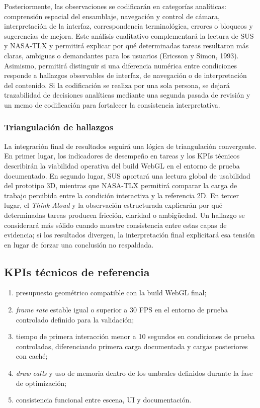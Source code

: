 Posteriormente, las observaciones se codificar\'an en categor\'ias anal\'iticas: comprensi\'on espacial del ensamblaje, navegaci\'on y control de c\'amara, interpretaci\'on de la interfaz, correspondencia terminol\'ogica, errores o bloqueos y sugerencias de mejora. Este an\'alisis cualitativo complementar\'a la lectura de SUS y NASA-TLX y permitir\'a explicar por qu\'e determinadas tareas resultaron m\'as claras, ambiguas o demandantes para los usuarios (Ericsson y Simon, 1993). Asimismo, permitir\'a distinguir si una diferencia num\'erica entre condiciones responde a hallazgos observables de interfaz, de navegaci\'on o de interpretaci\'on del contenido. Si la codificaci\'on se realiza por una sola persona, se dejar\'a trazabilidad de decisiones anal\'iticas mediante una segunda pasada de revisi\'on y un memo de codificaci\'on para fortalecer la consistencia interpretativa.

\subsubsection{Triangulaci\'on de hallazgos}

La integraci\'on final de resultados seguir\'a una l\'ogica de triangulaci\'on convergente. En primer lugar, los indicadores de desempe\~no en tareas y los KPIs t\'ecnicos describir\'an la viabilidad operativa del build WebGL en el entorno de prueba documentado. En segundo lugar, SUS aportar\'a una lectura global de usabilidad del prototipo 3D, mientras que NASA-TLX permitir\'a comparar la carga de trabajo percibida entre la condici\'on interactiva y la referencia 2D. En tercer lugar, el \textit{Think-Aloud} y la observaci\'on estructurada explicar\'an por qu\'e determinadas tareas producen fricci\'on, claridad o ambig\"uedad. Un hallazgo se considerar\'a m\'as s\'olido cuando muestre consistencia entre estas capas de evidencia; si los resultados divergen, la interpretaci\'on final explicitar\'a esa tensi\'on en lugar de forzar una conclusi\'on no respaldada.

\subsection{KPIs t\'ecnicos de referencia}

\begin{enumerate}
    \item presupuesto geom\'etrico compatible con la build WebGL final;
    \item \textit{frame rate} estable igual o superior a 30 FPS en el entorno de prueba controlado definido para la validaci\'on;
    \item tiempo de primera interacci\'on menor a 10 segundos en condiciones de prueba controladas, diferenciando primera carga documentada y cargas posteriores con cach\'e;
    \item \textit{draw calls} y uso de memoria dentro de los umbrales definidos durante la fase de optimizaci\'on;
    \item consistencia funcional entre escena, UI y documentaci\'on.
\end{enumerate}

\newpage
